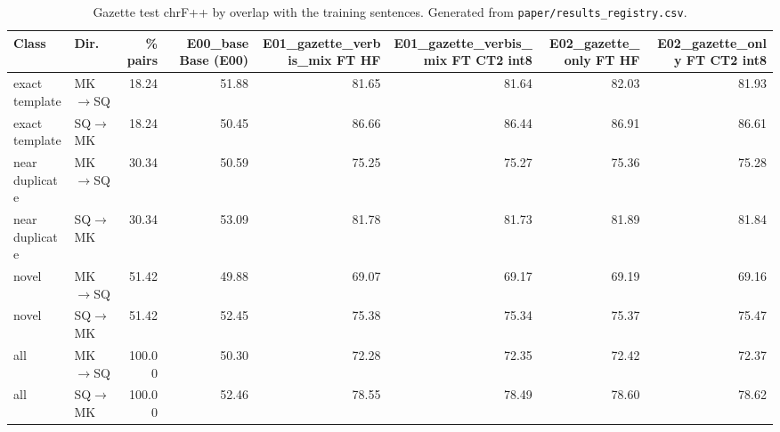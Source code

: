 \begin{table}[t]
\centering
\small
\begin{tabular}{llrrrrrr}
\toprule
Class & Dir. & \% pairs & E00\_base Base (E00) & E01\_gazette\_verbis\_mix FT HF & E01\_gazette\_verbis\_mix FT CT2 int8 & E02\_gazette\_only FT HF & E02\_gazette\_only FT CT2 int8 \\
\midrule
exact template & MK$\rightarrow$SQ & 18.24 & 51.88 & 81.65 & 81.64 & 82.03 & 81.93 \\
exact template & SQ$\rightarrow$MK & 18.24 & 50.45 & 86.66 & 86.44 & 86.91 & 86.61 \\
near duplicate & MK$\rightarrow$SQ & 30.34 & 50.59 & 75.25 & 75.27 & 75.36 & 75.28 \\
near duplicate & SQ$\rightarrow$MK & 30.34 & 53.09 & 81.78 & 81.73 & 81.89 & 81.84 \\
novel & MK$\rightarrow$SQ & 51.42 & 49.88 & 69.07 & 69.17 & 69.19 & 69.16 \\
novel & SQ$\rightarrow$MK & 51.42 & 52.45 & 75.38 & 75.34 & 75.37 & 75.47 \\
all & MK$\rightarrow$SQ & 100.00 & 50.30 & 72.28 & 72.35 & 72.42 & 72.37 \\
all & SQ$\rightarrow$MK & 100.00 & 52.46 & 78.55 & 78.49 & 78.60 & 78.62 \\
\bottomrule
\end{tabular}
\caption{Gazette test chrF++ by overlap with the training sentences. Generated from \texttt{paper/results\_registry.csv}.}
\label{tab:overlap}
\end{table}
